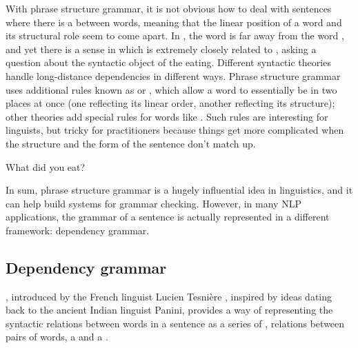 With phrase structure grammar, it is not obvious how to deal with sentences where there is a  between words, meaning that the linear position of a word and its structural role seem to come apart.  In , the word  is far away from the word , and yet there is a sense in which  is extremely closely related to , asking a question about the syntactic object of the eating.  Different syntactic theories handle long-distance dependencies in different ways.  Phrase structure grammar uses additional rules known as  or , which allow a word to essentially be in two places at once (one reflecting its linear order, another reflecting its structure); other theories add special rules for words like .  Such rules are interesting for linguists, but tricky for practitioners because things get more complicated when the structure and the form of the sentence don't match up.


\ea \label{ex:wh} What did you eat?
\z 

In sum, phrase structure grammar is a hugely influential idea in linguistics, and it can help build systems for grammar checking.  However, in many NLP applications, the grammar of a sentence is actually represented in a different framework: dependency grammar.




\subsection{Dependency grammar}

, introduced by the French linguist Lucien Tesni\`ere \citep{Tesniere:1929}, inspired by ideas dating back to the ancient Indian linguist Panini, provides a way of representing the syntactic relations between words in a sentence as a series of ,  relations between pairs of words, a  and a .  

